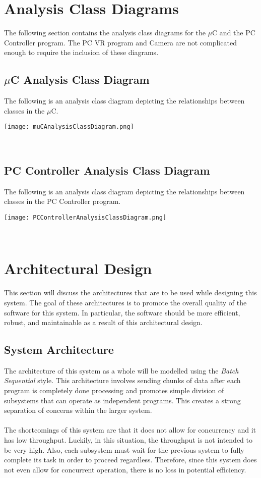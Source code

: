 \documentclass[titlepage]{article}
\begin{document}
\section{Analysis Class Diagrams}
The following section contains the analysis class diagrams for the $\mu$C and the PC Controller program. The PC VR program and Camera are not complicated enough to require the inclusion of these diagrams.
\subsection{$\mu$C Analysis Class Diagram}
The following is an analysis class diagram depicting the relationships between classes in the $\mu$C.\\
\begin{center}
	\texttt{[image: muCAnalysisClassDiagram.png]}
\label{fig:muC analysis class diagram}
\end{center}~\\
\newpage
\subsection{PC Controller Analysis Class Diagram}
The following is an analysis class diagram depicting the relationships between classes in the PC Controller program.\\
\begin{center}
	\texttt{[image: PCControllerAnalysisClassDiagram.png]}
\label{fig:PC controller analysis class diagram}
\end{center}~\\



\section{Architectural Design}
This section will discuss the architectures that are to be used while designing this system. The goal of these architectures is to promote the overall quality of the software for this system. In particular, the software should be more efficient, robust, and maintainable as a result of this architectural design.
\subsection{System Architecture}
The architecture of this system as a whole will be modelled using the \textit{Batch Sequential} style. This architecture involves sending chunks of data after each program is completely done processing and promotes simple division of subsystems that can operate as independent programs. This creates a strong separation of concerns within the larger system.\\~\\
The shortcomings of this system are that it does not allow for concurrency and it has low throughput. Luckily, in this situation, the throughput is not intended to be very high. Also, each subsystem must wait for the previous system to fully complete its task in order to proceed regardless. Therefore, since this system does not even allow for concurrent operation, there is no loss in potential efficiency.
\end{document}
